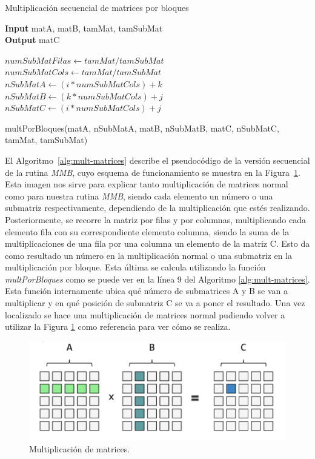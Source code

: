 \documentclass[a4paper,12pt]{article}
\begin{document}
\begin{algorithm}[htbp]
	\caption{Multiplicación secuencial de matrices por bloques}
    \hspace*{\algorithmicindent} \textbf{Input} matA, matB, tamMat, tamSubMat\\
    \hspace*{\algorithmicindent} \textbf{Output} matC
	\begin{algorithmic}[1]
	    \State $numSubMatFilas \leftarrow tamMat/tamSubMat$
		\State $numSubMatCols \leftarrow tamMat/tamSubMat$
				\State $nSubMatA \leftarrow (i * numSubMatCols) + k$ 
				\State $nSubMatB \leftarrow  (k * numSubMatCols) + j$
				\State $nSubMatC \leftarrow  (i * numSubMatCols) + j$
				
				\State multPorBloques(matA, nSubMatA, matB, nSubMatB, matC, nSubMatC, tamMat, tamSubMat)
        \EndFor
        \EndFor
		\EndFor
	\end{algorithmic}
	\label{alg:mult-matrices}
\end{algorithm}







El Algoritmo~\ref{alg:mult-matrices} describe el pseudocódigo de la versión secuencial de la rutina {\it MMB}, cuyo esquema de funcionamiento se muestra en la Figura~\ref{fig:mult-matrices}. Esta imagen nos sirve para explicar tanto multiplicación de matrices normal como para nuestra rutina {\it MMB}, siendo cada elemento un número o una submatriz respectivamente, dependiendo de la multiplicación que estés realizando. Posteriormente, se recorre la matriz por filas y por columnas, multiplicando cada elemento fila con su correspondiente elemento columna, siendo la suma de la multiplicaciones de una fila por una columna un elemento de la matriz C. Esto da como resultado un número en la multiplicación normal o una submatriz en la multiplicación por bloque. Esta última se calcula utilizando la función {\it multPorBloques} como se puede ver en la línea 9 del Algoritmo \ref{alg:mult-matrices}. Esta función internamente ubica qué número de submatrices A y B se van a multiplicar y en qué posición de submatriz C se va a poner el resultado. Una vez localizado se hace una multiplicación de matrices normal pudiendo volver a utilizar la Figura \ref{fig:mult-matrices} como referencia para ver cómo se realiza.


\begin{figure}[htbp]
    \includegraphics[scale=0.5]{./images/multiplicacion.png}
    \centering
    \caption{Multiplicación de matrices.}
    \label{fig:mult-matrices}
\end{figure}
\end{document}
